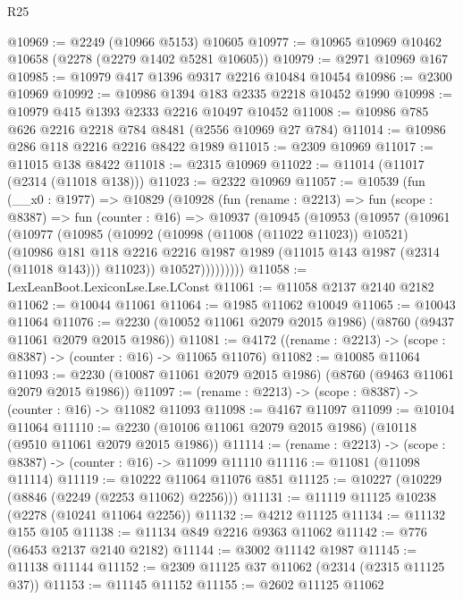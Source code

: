 \begin{lexlean}{R25}
\begin{coremodule}
@10969 := @2249 (@10966 @5153) @10605
@10977 := @10965 @10969 @10462 @10658 (@2278 (@2279 @1402 @5281 @10605))
@10979 := @2971 @10969 @167
@10985 := @10979 @417 @1396 @9317 @2216 @10484 @10454
@10986 := @2300 @10969
@10992 := @10986 @1394 @183 @2335 @2218 @10452 @1990
@10998 := @10979 @415 @1393 @2333 @2216 @10497 @10452
@11008 := @10986 @785 @626 @2216 @2218 @784 @8481 (@2556 @10969 @27 @784)
@11014 := @10986 @286 @118 @2216 @2216 @8422 @1989
@11015 := @2309 @10969
@11017 := @11015 @138 @8422
@11018 := @2315 @10969
@11022 := @11014 (@11017 (@2314 (@11018 @138)))
@11023 := @2322 @10969
@11057 := @10539
    (fun (__x0 : @1977) =>
    @10829
      (@10928
        (fun (rename : @2213) =>
        fun (scope : @8387) =>
        fun (counter : @16) =>
        @10937
          (@10945
            (@10953
              (@10957
                (@10961
                  (@10977
                    (@10985
                      (@10992
                        (@10998 (@11008 (@11022 @11023)) @10521)
                        (@10986
                          @181
                          @118
                          @2216
                          @2216
                          @1987
                          @1989
                          (@11015 @143 @1987 (@2314 (@11018 @143)))
                          @11023))
                      @10527)))))))))
@11058 := LexLeanBoot.LexiconLse.Lse.LConst
@11061 := @11058 @2137 @2140 @2182
@11062 := @10044 @11061
@11064 := @1985 @11062 @10049
@11065 := @10043 @11064
@11076 := @2230 (@10052 @11061 @2079 @2015 @1986) (@8760 (@9437 @11061 @2079 @2015 @1986))
@11081 := @4172 ((rename : @2213) -> (scope : @8387) -> (counter : @16) -> @11065 @11076)
@11082 := @10085 @11064
@11093 := @2230 (@10087 @11061 @2079 @2015 @1986) (@8760 (@9463 @11061 @2079 @2015 @1986))
@11097 := (rename : @2213) -> (scope : @8387) -> (counter : @16) -> @11082 @11093
@11098 := @4167 @11097
@11099 := @10104 @11064
@11110 := @2230 (@10106 @11061 @2079 @2015 @1986) (@10118 (@9510 @11061 @2079 @2015 @1986))
@11114 := (rename : @2213) -> (scope : @8387) -> (counter : @16) -> @11099 @11110
@11116 := @11081 (@11098 @11114)
@11119 := @10222 @11064 @11076 @851
@11125 := @10227 (@10229 (@8846 (@2249 (@2253 @11062) @2256)))
@11131 := @11119 @11125 @10238 (@2278 (@10241 @11064 @2256))
@11132 := @4212 @11125
@11134 := @11132 @155 @105
@11138 := @11134 @849 @2216 @9363 @11062
@11142 := @776 (@6453 @2137 @2140 @2182)
@11144 := @3002 @11142 @1987
@11145 := @11138 @11144
@11152 := @2309 @11125 @37 @11062 (@2314 (@2315 @11125 @37))
@11153 := @11145 @11152
@11155 := @2602 @11125 @11062

\end{coremodule}
\end{lexlean}
